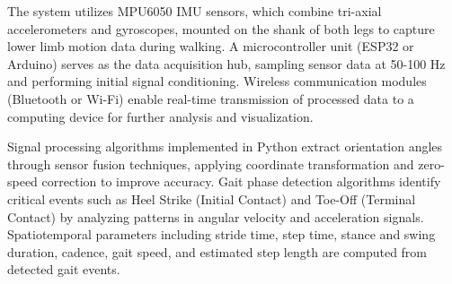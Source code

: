 \documentclass[12pt,a4paper]{report}
\begin{document}
The system utilizes MPU6050 IMU sensors, which combine tri-axial accelerometers and gyroscopes, mounted on the shank of both legs to capture lower limb motion data during walking. A microcontroller unit (ESP32 or Arduino) serves as the data acquisition hub, sampling sensor data at 50-100 Hz and performing initial signal conditioning. Wireless communication modules (Bluetooth or Wi-Fi) enable real-time transmission of processed data to a computing device for further analysis and visualization.

Signal processing algorithms implemented in Python extract orientation angles through sensor fusion techniques, applying coordinate transformation and zero-speed correction to improve accuracy. Gait phase detection algorithms identify critical events such as Heel Strike (Initial Contact) and Toe-Off (Terminal Contact) by analyzing patterns in angular velocity and acceleration signals. Spatiotemporal parameters including stride time, step time, stance and swing duration, cadence, gait speed, and estimated step length are computed from detected gait events.
\end{document}
